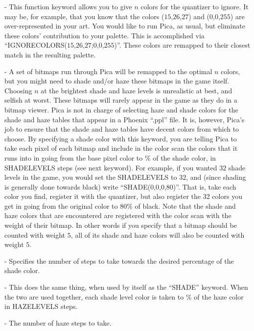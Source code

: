  - This function 
keyword allows you to give $n$ colors for the quantizer to ignore. It may be, for
example, that you know that the colors ($15$,$26$,$27$) and ($0$,$0$,$255$) are
over-represented in your art. You would like to run Pica, as usual, but eliminate
these colors' contribution to your palette. This is accomplished via
``IGNORECOLORS($15$,$26$,$27$;$0$,$0$,$255$)''. These colors are remapped to their
closest match in the resulting palette.

 - A set of bitmaps run through Pica will be remapped
to the optimal $n$ colors, but you might need to shade and/or haze these bitmaps
in the game itself. Choosing $n$ at the brightest shade and haze levels is unrealistic
at best, and selfish at worst. These bitmaps will rarely appear in the game as
they do in a bitmap viewer. Pica is not in charge of selecting haze and shade colors
for the shade and haze tables that appear in a Phoenix ``.ppl'' file. It is, however,
Pica's job to ensure that the shade and haze tables have decent colors from which to
choose. By specifying a shade color with this keyword, you are telling Pica to take
each pixel of each bitmap and include in the color scan the colors that it runs into
in going from the base pixel color to $\%$ of the shade color, in SHADELEVELS steps (see
next keyword). For example, if you wanted $32$ shade levels in the game, you would
set the SHADELEVELS to $32$, and (since shading is generally done towards black) 
write ``SHADE(0,0,0,80)''. That is, take each color you find, register it with the 
quantizer, but also register the 32 colors you get in going from the original color
to $80\%$ of black. Note that the shade and haze colors that are encountered are registered
with the color scan with the weight of their bitmap. In other words if you specify that
a bitmap should be counted with weight $5$, all of its shade and haze colors will also
be counted with weight $5$.

 - Specifies the number of steps to take towards the
desired percentage of the shade color.

 - This does the same thing, when used by itself
as the ``SHADE'' keyword. When the two are used together, each shade level color
is taken to $\%$ of the haze color in HAZELEVELS steps. 

 - The number of haze steps to take.

